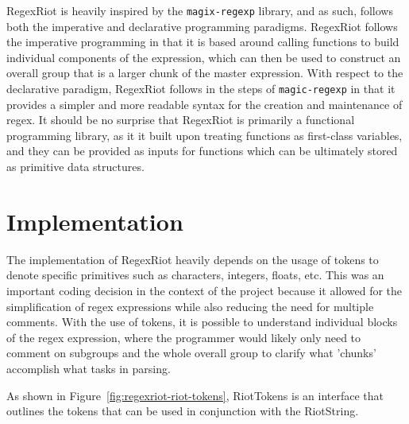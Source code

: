 \documentclass[conference]{IEEEtran}
\begin{document}
RegexRiot is heavily inspired by the \texttt{magix-regexp} library, and as such,
follows both the imperative and declarative programming paradigms. \cite{magic-regexp}
RegexRiot follows the imperative programming in that it is based around calling functions
to build individual components of the expression, which can then be used to construct an
overall group that is a larger chunk of the master expression. With respect to the
declarative paradigm, RegexRiot follows in the steps of \texttt{magic-regexp}
in that it provides a simpler and more readable syntax for the creation and
maintenance of regex. It should be no surprise that RegexRiot is primarily a functional programming
library, as it it built upon treating functions as first-class variables, and they can be provided as inputs
for functions which can be ultimately stored as primitive data structures.

\section{Implementation}
The implementation of RegexRiot heavily depends on the usage of tokens to denote specific
primitives such as characters, integers, floats, etc. This was an important coding decision
in the context of the project because it allowed for the simplification of regex expressions
while also reducing the need for multiple comments. With the use of tokens, it is possible to
understand individual blocks of the regex expression, where the programmer would likely only
need to comment on subgroups and the whole overall group to clarify what 'chunks' accomplish
what tasks in parsing.

As shown in Figure~\ref{fig:regexriot-riot-tokens}, RiotTokens is an interface that outlines the tokens that can
be used in conjunction with the RiotString.
\end{document}
